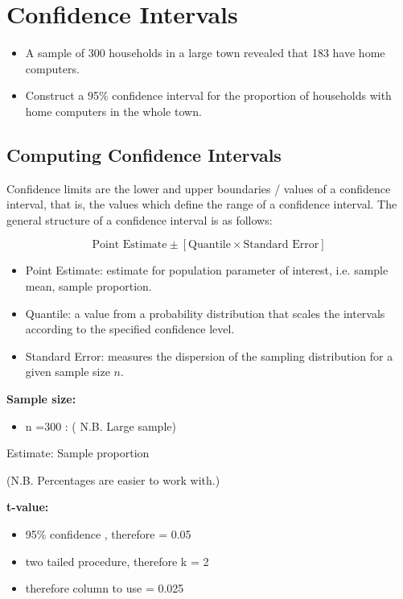 \documentclass[a4paper,12pt]{article}
\begin{document}
\section{Confidence Intervals}

\begin{itemize}
	\item A sample of 300 households in a large town revealed that 183 have home computers.
	\item Construct a 95\% confidence interval for the proportion of households with home computers in the whole town.
\end{itemize}



\subsection*{Computing Confidence Intervals}
Confidence limits are the lower and upper boundaries / values of a confidence interval, that is, the values which define the range of a confidence interval. The general structure of a confidence interval is as follows:

\[ \mbox{Point Estimate}  \pm \left[ \mbox{Quantile} \times \mbox{Standard Error} \right] \]


\begin{itemize}
\item Point Estimate: estimate for population parameter of interest, i.e. sample mean, sample proportion.
\item Quantile: a value from a probability distribution that scales the intervals according to the specified confidence level.
\item Standard Error: measures the dispersion of the sampling distribution for a given sample size $n$.
\end{itemize}

 
\textbf{Sample size:}       
\begin{itemize}
	\item n =300 :  ( N.B. Large sample)
\end{itemize}  
 
Estimate:             Sample proportion   
 
    (N.B. Percentages are easier to work with.)
 
\textbf{t-value:}           

\begin{itemize}
\item 95\% confidence , therefore  = 0.05
\item two tailed procedure, therefore k = 2
\item therefore column to use = 0.025
\end{itemize}
 
\end{document}
